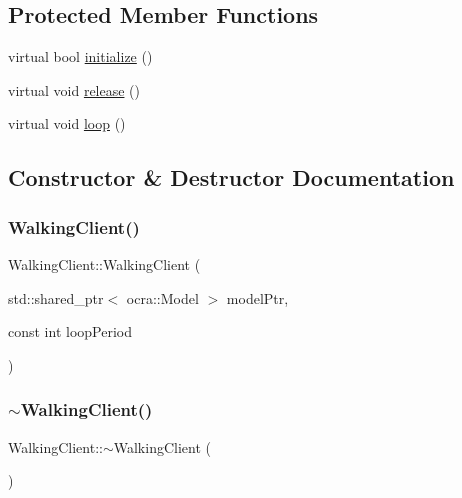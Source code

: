 \subsection*{Protected Member Functions}
\begin{DoxyCompactItemize}
\item 
virtual bool \hyperlink{classWalkingClient_aba6a03fe29a4e947bc6bc0c09a713b2a}{initialize} ()
\item 
virtual void \hyperlink{classWalkingClient_a3b36da9d7649865a13c9318dd73ebc7e}{release} ()
\item 
virtual void \hyperlink{classWalkingClient_afd997bb00534c57fe1b0d5f37f207386}{loop} ()
\end{DoxyCompactItemize}


\subsection{Constructor \& Destructor Documentation}
\hypertarget{classWalkingClient_a6c9002a44a54814c4b482739824e39aa}{}\label{classWalkingClient_a6c9002a44a54814c4b482739824e39aa} 
\subsubsection{\texorpdfstring{Walking\+Client()}{WalkingClient()}}
{\footnotesize\ttfamily Walking\+Client\+::\+Walking\+Client (\begin{DoxyParamCaption}\item[{std\+::shared\+\_\+ptr$<$ ocra\+::\+Model $>$}]{model\+Ptr,  }\item[{const int}]{loop\+Period }\end{DoxyParamCaption})}

\hypertarget{classWalkingClient_a1dbc0308f844aea6542750104fddf8e2}{}\label{classWalkingClient_a1dbc0308f844aea6542750104fddf8e2} 
\subsubsection{\texorpdfstring{$\sim$\+Walking\+Client()}{~WalkingClient()}}
{\footnotesize\ttfamily Walking\+Client\+::$\sim$\+Walking\+Client (\begin{DoxyParamCaption}{ }\end{DoxyParamCaption})\hspace{0.3cm}{\ttfamily [virtual]}}




